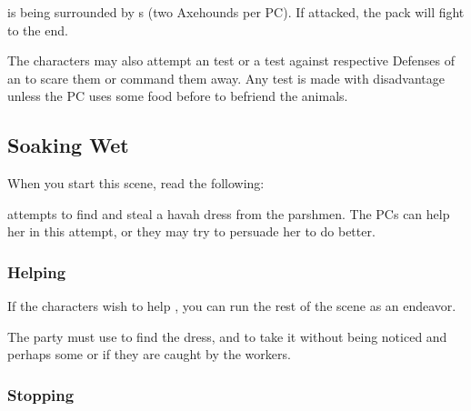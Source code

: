
\npcTroublemaker{} is being surrounded by \enemyAxehound{}s (two Axehounds per PC). If attacked, the pack will fight to the end.

The characters may also attempt an \skillIntimiation{} test or a \skillLeadership{} test against respective Defenses of an \enemyAxehound{} to scare them or command them away. Any test is made with disadvantage unless the PC uses some food before to befriend the animals. 




\subsection{Soaking Wet}

When you start this scene, read the following:


\npcTroublemaker{} attempts to find and steal a havah dress from the parshmen. The PCs can help her in this attempt, or they may try to persuade her to do better.

\subsubsection{Helping \npcTroublemaker{}}

If the characters wish to help \npcTroublemaker{}, you can run the rest of the scene as an endeavor.

The party must use \skillPerception{} to find the dress, \skillThievery{} and \skillStealth{} to take it without being noticed and perhaps some \skillIntimiation{} or \skillDeception{} if they are caught by the workers.

\subsubsection{Stopping \npcTroublemaker{}}

